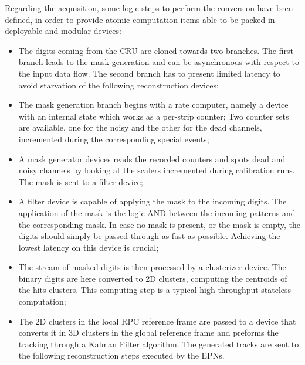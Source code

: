 Regarding the acquisition, some logic steps to perform the conversion have been defined, in order to provide atomic computation items able to be packed in deployable and modular devices:
\begin{itemize}
    \item The digits coming from the CRU are cloned towards two branches.
    The first branch leads to the mask generation and can be asynchronous with respect to the input data flow.
    The second branch has to present limited latency to avoid starvation of the following reconstruction devices;
    \item The mask generation branch begins with a rate computer, namely a device with an internal state which works as a per-strip counter;
	Two counter sets are available, one for the noisy and the other for the dead channels, incremented during the corresponding special events;
    \item  A mask generator devices reads the recorded counters and spots dead and noisy channels by looking at the scalers incremented during calibration runs.
    The mask is sent to a filter device;
    \item A filter device is capable of applying the mask to the incoming digits.
    The application of the mask is the logic AND between the incoming patterns and the corresponding mask.
    In case no mask is present, or the mask is empty, the digits should simply be passed through as fast as possible.
    Achieving the lowest latency on this device is crucial;
    \item The stream of masked digits is then processed by a clusterizer device. The binary digits are here converted to 2D clusters, computing the centroids of the hits clusters. 
    This computing step is a typical high throughput stateless computation;
    \item The 2D clusters in the local RPC reference frame are passed to a device that converts it in 3D clusters in the global reference frame and preforms the tracking through a Kalman Filter algorithm.
    The generated tracks are sent to the following reconstruction steps executed by the EPNs.
\end{itemize}

